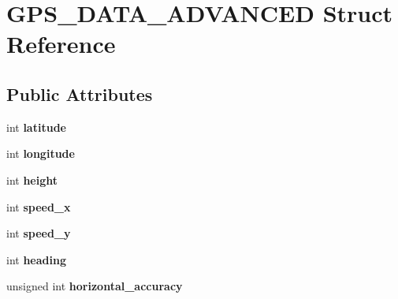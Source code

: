 \hypertarget{struct_g_p_s___d_a_t_a___a_d_v_a_n_c_e_d}{\section{G\-P\-S\-\_\-\-D\-A\-T\-A\-\_\-\-A\-D\-V\-A\-N\-C\-E\-D Struct Reference}
\label{struct_g_p_s___d_a_t_a___a_d_v_a_n_c_e_d}
}
\subsection*{Public Attributes}
\begin{DoxyCompactItemize}
\item 
\hypertarget{struct_g_p_s___d_a_t_a___a_d_v_a_n_c_e_d_a2c350613585efbb225d8d5b7ee4f8912}{int {\bfseries latitude}}\label{struct_g_p_s___d_a_t_a___a_d_v_a_n_c_e_d_a2c350613585efbb225d8d5b7ee4f8912}

\item 
\hypertarget{struct_g_p_s___d_a_t_a___a_d_v_a_n_c_e_d_a8ed6bae3fcad123f6dc7ffa4ecb8109c}{int {\bfseries longitude}}\label{struct_g_p_s___d_a_t_a___a_d_v_a_n_c_e_d_a8ed6bae3fcad123f6dc7ffa4ecb8109c}

\item 
\hypertarget{struct_g_p_s___d_a_t_a___a_d_v_a_n_c_e_d_a89696b4ad7e0317127eaa2cfe2163f8b}{int {\bfseries height}}\label{struct_g_p_s___d_a_t_a___a_d_v_a_n_c_e_d_a89696b4ad7e0317127eaa2cfe2163f8b}

\item 
\hypertarget{struct_g_p_s___d_a_t_a___a_d_v_a_n_c_e_d_a6f2e0e72411d707e21d46e40e21f44e6}{int {\bfseries speed\-\_\-x}}\label{struct_g_p_s___d_a_t_a___a_d_v_a_n_c_e_d_a6f2e0e72411d707e21d46e40e21f44e6}

\item 
\hypertarget{struct_g_p_s___d_a_t_a___a_d_v_a_n_c_e_d_a07882d23a003884988cb09f16d1d04e4}{int {\bfseries speed\-\_\-y}}\label{struct_g_p_s___d_a_t_a___a_d_v_a_n_c_e_d_a07882d23a003884988cb09f16d1d04e4}

\item 
\hypertarget{struct_g_p_s___d_a_t_a___a_d_v_a_n_c_e_d_a251c8228a8981e448687f0e8d452852c}{int {\bfseries heading}}\label{struct_g_p_s___d_a_t_a___a_d_v_a_n_c_e_d_a251c8228a8981e448687f0e8d452852c}

\item 
\hypertarget{struct_g_p_s___d_a_t_a___a_d_v_a_n_c_e_d_abd698a0b380f01bb869c401f775a295d}{unsigned int {\bfseries horizontal\-\_\-accuracy}}\label{struct_g_p_s___d_a_t_a___a_d_v_a_n_c_e_d_abd698a0b380f01bb869c401f775a295d}


\end{DoxyCompactItemize}
